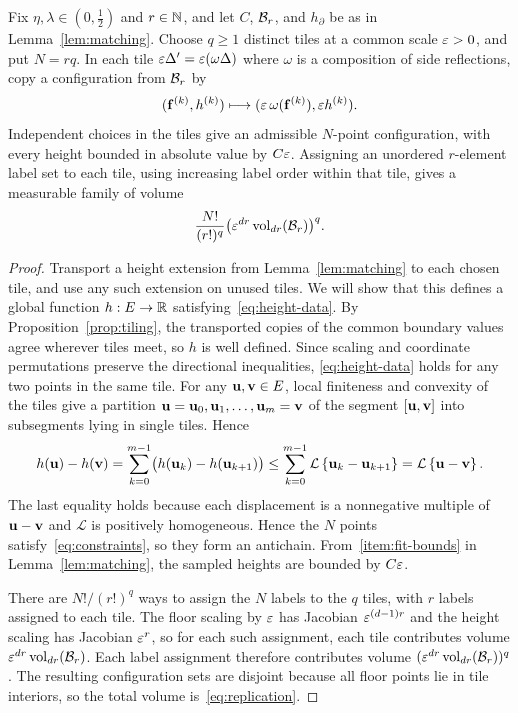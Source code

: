 \documentclass[11pt,letterpaper]{article}
\begin{document}
\begin{lemma}\label{lem:replication}
      Fix $\eta,\lambda\in(0,\frac12)$ and $r\in\mathbb N$, and let $C$, $\mathcal B_r$, and $h_\partial$ be as in Lemma~\ref{lem:matching}. Choose $q\ge1$ distinct tiles at a common scale $\varepsilon>0$, and put $N=rq$. In each tile $\varepsilon\Delta'=\varepsilon(\omega\Delta)$ where $\omega$ is a composition of side reflections, copy a configuration from $\mathcal B_r$ by
      \[
            (\mathbf f^{(k)},h^{(k)})\longmapsto(\varepsilon\,\omega(\mathbf f^{(k)}),\varepsilon h^{(k)}).
      \]
      Independent choices in the tiles give an admissible $N$-point configuration, with every height bounded in absolute value by $C\varepsilon$. Assigning an unordered $r$-element label set to each tile, using increasing label order within that tile, gives a measurable family of volume
      \begin{equation}\label{eq:replication}
            \frac{N!}{(r!)^q}\bigl(\varepsilon^{dr}\operatorname{vol}_{dr}(\mathcal B_r)\bigr)^q.
      \end{equation}
\end{lemma}
\begin{proof}
      Transport a height extension from Lemma~\ref{lem:matching} to each chosen tile, and use any such extension on unused tiles. We will show that this defines a global function $h:E\to \mathbb R$ satisfying~\eqref{eq:height-data}.
      By Proposition~\ref{prop:tiling}, the transported copies of the common boundary values agree wherever tiles meet, so $h$ is well defined. Since scaling and coordinate permutations preserve the directional inequalities, \eqref{eq:height-data} holds for any two points in the same tile. For any $\mathbf u,\mathbf v\in E$, local finiteness and convexity of the tiles give a partition $\mathbf u=\mathbf u_0,\mathbf u_1,\ldots,\mathbf u_m=\mathbf v$ of the segment $[\mathbf u,\mathbf v]$ into subsegments lying in single tiles. Hence
      \[
            h(\mathbf u)-h(\mathbf v)=\sum_{k=0}^{m-1}\bigl(h(\mathbf u_k)-h(\mathbf u_{k+1})\bigr)\le\sum_{k=0}^{m-1}\mathcal L\left\{\mathbf u_k-\mathbf u_{k+1}\right\}=\mathcal L\left\{\mathbf u-\mathbf v\right\}.
      \]
      The last equality holds because each displacement is a nonnegative multiple of $\mathbf u-\mathbf v$ and $\mathcal L$ is positively homogeneous.
      Hence the $N$ points satisfy~\eqref{eq:constraints}, so they form an antichain.
      From~\ref{item:fit-bounds} in Lemma~\ref{lem:matching}, the sampled heights are bounded by $C\varepsilon$.

      There are $N!/(r!)^q$ ways to assign the $N$ labels to the $q$ tiles, with $r$ labels assigned to each tile. The floor scaling by $\varepsilon$ has Jacobian $\varepsilon^{(d-1)r}$ and the height scaling has Jacobian $\varepsilon^r$, so for each such assignment, each tile contributes volume $\varepsilon^{dr}\operatorname{vol}_{dr}(\mathcal B_r)$. Each label assignment therefore contributes volume $(\varepsilon^{dr}\operatorname{vol}_{dr}(\mathcal B_r))^{q}$. The resulting configuration sets are disjoint because all floor points lie in tile interiors, so the total volume is~\eqref{eq:replication}.
\end{proof}
\end{document}
